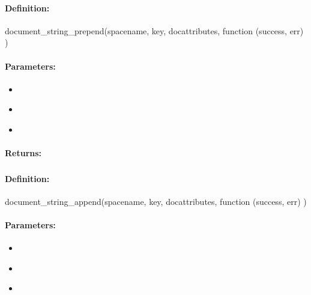 \paragraph{Definition:}
\begin{javascriptcode}
document_string_prepend(spacename, key, docattributes, function (success, err) {})
\end{javascriptcode}
\paragraph{Parameters:}
\begin{itemize}[noitemsep]
\item {}\\

\item {}\\

\item {}\\

\end{itemize}

\paragraph{Returns:}


\pagebreak
\subsubsection{}
\label{api:nodejs:document_string_append}


\paragraph{Definition:}
\begin{javascriptcode}
document_string_append(spacename, key, docattributes, function (success, err) {})
\end{javascriptcode}
\paragraph{Parameters:}
\begin{itemize}[noitemsep]
\item {}\\

\item {}\\

\item {}\\

\end{itemize}

